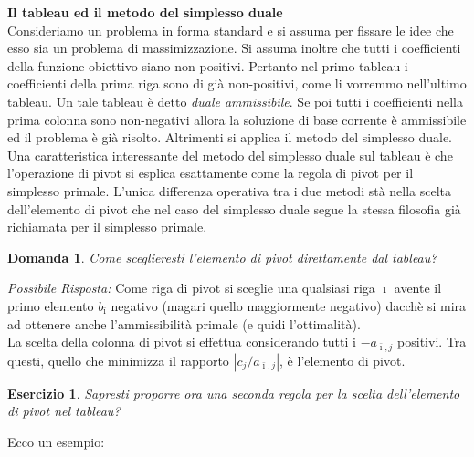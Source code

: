 \documentclass[10pt]{article}
\newtheorem{Dom}{Domanda}%
\newtheorem{Ese}{Esercizio}%
\begin{document}
\vspace{1cm}

\bigskip

{\large \bf Il tableau ed il metodo del simplesso duale}\\


Consideriamo un problema in forma standard
e si assuma per fissare le idee che esso sia
un problema di massimizzazione.
Si assuma inoltre che tutti i coefficienti della funzione obiettivo
siano non-positivi.
Pertanto nel primo tableau i coefficienti della prima riga
sono di gi\`a non-positivi, come li vorremmo nell'ultimo tableau.
Un tale tableau \`e detto {\em duale ammissibile}.
Se poi tutti i coefficienti nella prima colonna sono
non-negativi allora la soluzione di base corrente
\`e ammissibile ed il problema \`e gi\`a risolto.
Altrimenti si applica il metodo del simplesso
duale.
Una caratteristica interessante del metodo del
simplesso duale sul tableau \`e che l'operazione di
pivot si esplica esattamente come la regola di pivot
per il simplesso primale.
L'unica differenza operativa tra i due metodi
st\`a nella scelta dell'elemento di pivot
che nel caso del simplesso duale segue
la stessa filosofia gi\`a richiamata
per il simplesso primale.

\begin{Dom}
   Come sceglieresti l'elemento di pivot direttamente dal tableau?
\end{Dom}
{\em Possibile Risposta: \/}
Come riga di pivot si sceglie
una qualsiasi riga $\bar{\imath}$
avente il primo elemento $b_{\bar{\imath}}$
negativo (magari quello maggiormente negativo)
dacch\`e si mira ad ottenere anche l'ammissibilit\`a primale
(e quidi l'ottimalit\`a).\\

La scelta della colonna di pivot si effettua
considerando tutti i $-a_{\bar{\imath},j}$ positivi.
Tra questi, quello che minimizza il rapporto 
$|c_j/a_{\bar{\imath},j}|$,
\`e l'elemento di pivot.\\ 

\begin{Ese}
   Sapresti proporre ora una seconda regola per
   la scelta dell'elemento di pivot nel tableau?
\end{Ese}



Ecco un esempio:
\end{document}
